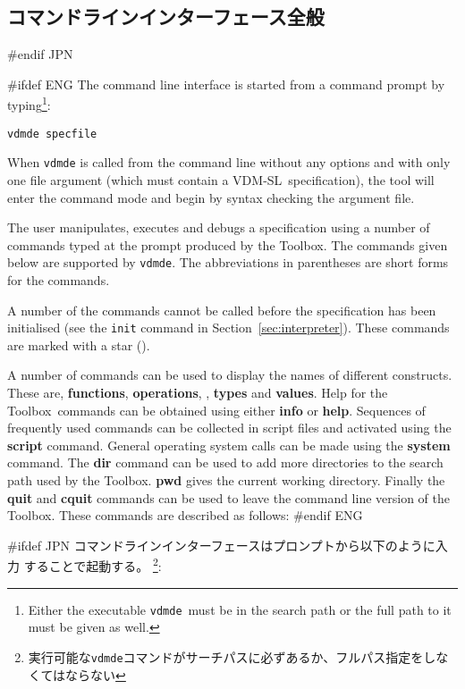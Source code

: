 \documentclass[\pformat,12pt]{article}
\newcommand{\vdmslpp}{VDM-SL}
\newcommand{\Toolbox}{Toolbox}
\newcommand{\vdmde}{vdmde}
\newcommand{\vdmslpp}{VDM++}
\newcommand{\Toolbox}{Toolbox}
\newcommand{\vdmde}{vppde}
\newcommand{\cmd}{\tt }
\begin{document}
\subsection{コマンドラインインターフェース全般}\label{subsec:maincommand}
#endif JPN

#ifdef ENG
The command line interface is started from a command prompt by
typing\footnote{Either the executable {\tt \vdmde}\ must be in the
  search path or the full path to it must be given as well.}:

{\tt \vdmde\ specfile}

When {\tt \vdmde} is called from the command line without any options
and with only one file argument (which must contain a \vdmslpp\ 
specification), the tool will enter the command mode and begin by
syntax checking the argument file.

The user manipulates, executes and debugs a specification using a
number of commands typed at the prompt produced by the \Toolbox.  The
commands given below are supported by {\tt \vdmde}.  The abbreviations
in parentheses are short forms for the commands.

A number of the commands cannot be called before the specification has
been initialised (see the {\cmd init} command in
Section~\ref{sec:interpreter}).  These commands are marked with a star
({\tt *}).

A number of commands can be used to display the names of different
constructs. These are,
\textbf{functions}, \textbf{operations},
,
\textbf{types} and \textbf{values}.  Help for the \Toolbox\ commands
can be obtained using either \textbf{info} or \textbf{help}. Sequences
of frequently used commands can be collected in script files and
activated using the \textbf{script} command. General operating system
calls can be made using the \textbf{system} command. The \textbf{dir}
command can be used to add more directories to the search path used by
the \Toolbox. \textbf{pwd} gives the current
working directory. Finally the \textbf{quit} and \textbf{cquit}
commands can be used to leave the command line version of the
\Toolbox.  These commands are described as follows:
#endif ENG

#ifdef JPN
コマンドラインインターフェースはプロンプトから以下のように入力 することで起動する。
\footnote{実行可能な{\tt \vdmde}コマンドがサーチパスに必ずあるか、フルパス指定をしなくてはならない}:
\end{document}
